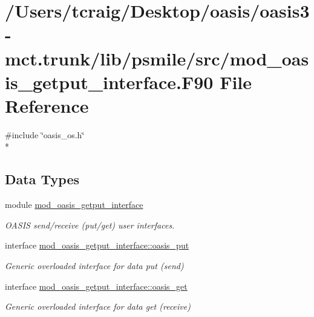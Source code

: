 \hypertarget{mod__oasis__getput__interface_8_f90}{\section{/\+Users/tcraig/\+Desktop/oasis/oasis3-\/mct.trunk/lib/psmile/src/mod\+\_\+oasis\+\_\+getput\+\_\+interface.F90 File Reference}
\label{mod__oasis__getput__interface_8_f90}
}
{\ttfamily \#include \char`\"{}oasis\+\_\+os.\+h\char`\"{}}\\*
\subsection*{Data Types}
\begin{DoxyCompactItemize}
\item 
module \hyperlink{classmod__oasis__getput__interface}{mod\+\_\+oasis\+\_\+getput\+\_\+interface}
\begin{DoxyCompactList}\small\item\em O\+A\+S\+I\+S send/receive (put/get) user interfaces. \end{DoxyCompactList}\item 
interface \hyperlink{interfacemod__oasis__getput__interface_1_1oasis__put}{mod\+\_\+oasis\+\_\+getput\+\_\+interface\+::oasis\+\_\+put}
\begin{DoxyCompactList}\small\item\em Generic overloaded interface for data put (send) \end{DoxyCompactList}\item 
interface \hyperlink{interfacemod__oasis__getput__interface_1_1oasis__get}{mod\+\_\+oasis\+\_\+getput\+\_\+interface\+::oasis\+\_\+get}
\begin{DoxyCompactList}\small\item\em Generic overloaded interface for data get (receive) \end{DoxyCompactList}\end{DoxyCompactItemize}
